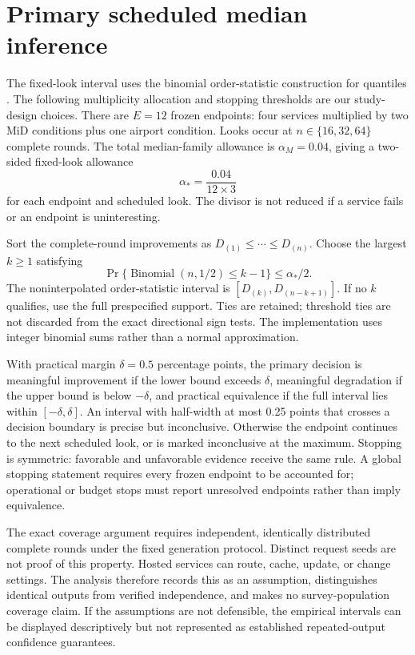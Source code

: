 \documentclass{article}
\begin{document}
\section{Primary scheduled median inference}
The fixed-look interval uses the binomial order-statistic construction for quantiles \citep[Section 5.3]{lu2020}. The following multiplicity allocation and stopping thresholds are our study-design choices.
There are $E=12$ frozen endpoints: four services multiplied by two MiD conditions plus one airport condition. Looks occur at $n\in\{16,32,64\}$ complete rounds. The total median-family allowance is $\alpha_M=0.04$, giving a two-sided fixed-look allowance
\begin{equation}
\alpha_* = \frac{0.04}{12\times3}
\end{equation}
for each endpoint and scheduled look. The divisor is not reduced if a service fails or an endpoint is uninteresting.

Sort the complete-round improvements as $D_{(1)}\leq\cdots\leq D_{(n)}$. Choose the largest $k\geq1$ satisfying
\begin{equation}
\Pr\{\operatorname{Binomial}(n,1/2)\leq k-1\}\leq\alpha_*/2.
\end{equation}
The noninterpolated order-statistic interval is $[D_{(k)},D_{(n-k+1)}]$. If no $k$ qualifies, use the full prespecified support. Ties are retained; threshold ties are not discarded from the exact directional sign tests. The implementation uses integer binomial sums rather than a normal approximation.

With practical margin $\delta=0.5$ percentage points, the primary decision is meaningful improvement if the lower bound exceeds $\delta$, meaningful degradation if the upper bound is below $-\delta$, and practical equivalence if the full interval lies within $[-\delta,\delta]$. An interval with half-width at most 0.25 points that crosses a decision boundary is precise but inconclusive. Otherwise the endpoint continues to the next scheduled look, or is marked inconclusive at the maximum. Stopping is symmetric: favorable and unfavorable evidence receive the same rule. A global stopping statement requires every frozen endpoint to be accounted for; operational or budget stops must report unresolved endpoints rather than imply equivalence.

The exact coverage argument requires independent, identically distributed complete rounds under the fixed generation protocol. Distinct request seeds are not proof of this property. Hosted services can route, cache, update, or change settings. The analysis therefore records this as an assumption, distinguishes identical outputs from verified independence, and makes no survey-population coverage claim. If the assumptions are not defensible, the empirical intervals can be displayed descriptively but not represented as established repeated-output confidence guarantees.
\end{document}
